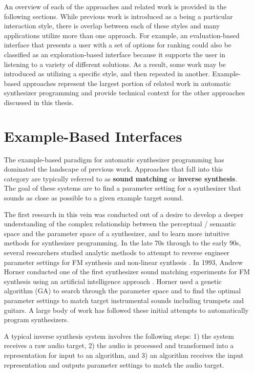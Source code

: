 An overview of each of the approaches and related work is provided in the following sections. While previous work is introduced as a being a particular interaction style, there is overlap between each of these styles and many applications utilize more than one approach. For example, an evaluation-based interface that presents a user with a set of options for ranking could also be classified as an exploration-based interface because it supports the user in listening to a variety of different solutions. As a result, some work may be introduced as utilizing a specific style, and then repeated in another. Example-based approaches represent the largest portion of related work in automatic synthesizer programming and provide technical context for the other approaches discussed in this thesis.

\section{Example-Based Interfaces}
\label{sec:asp-example-based}
The example-based paradigm for automatic synthesizer programming has dominated the landscape of previous work. Approaches that fall into this category are typically referred to as \textbf{sound matching} or \textbf{inverse synthesis}. The goal of these systems are to find a parameter setting for a synthesizer that sounds as close as possible to a given example target sound. 

The first research in this vein was conducted out of a desire to develop a deeper understanding of the complex relationship between the perceptual / semantic space and the parameter space of a synthesizer, and to learn more intuitive methods for synthesizer programming. In the late 70s through to the early 90s, several researchers studied analytic methods to attempt to reverse engineer parameter settings for FM synthesis \cite{justice1979analytic, beauchamp1982synthesis, payne1987microcomputer} and non-linear synthesis \cite{delprat1990parameter}. In 1993, Andrew Horner conducted one of the first synthesizer sound matching experiments for FM synthesis using an artificial intelligence approach \cite{horner1993machine}. Horner used a genetic algorithm (GA) to search through the parameter space and to find the optimal parameter settings to match target instrumental sounds including trumpets and guitars. A large body of work has followed these initial attempts to automatically program synthesizers.

A typical inverse synthesis system involves the following steps: 1) the system receives a raw audio target, 2) the audio is processed and transformed into a representation for input to an algorithm, and 3) an algorithm receives the input representation and outputs parameter settings to match the audio target.

